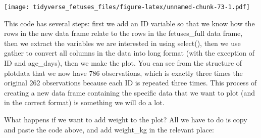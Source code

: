 \documentclass[
]{article}
\newenvironment{Shaded}{\begin{snugshade}}{\end{snugshade}}
\newcommand{\DataTypeTok}[1]{\textcolor[rgb]{0.13,0.29,0.53}{#1}}
\newcommand{\KeywordTok}[1]{\textcolor[rgb]{0.13,0.29,0.53}{\textbf{#1}}}
\newcommand{\NormalTok}[1]{#1}
\newcommand{\OperatorTok}[1]{\textcolor[rgb]{0.81,0.36,0.00}{\textbf{#1}}}
\newcommand{\StringTok}[1]{\textcolor[rgb]{0.31,0.60,0.02}{#1}}
\begin{document}
\texttt{[image: tidyverse\_fetuses\_files/figure-latex/unnamed-chunk-73-1.pdf]}

This code has several steps: first we add an ID variable so that we know
how the rows in the new data frame relate to the rows in the
fetuses\_full data frame, then we extract the variables we are
interested in using select(), then we use gather to convert all columns
in the data into long format (with the exception of ID and age\_days),
then we make the plot. You can see from the structure of plotdata that
we now have 786 observations, which is exactly three times the original
262 observations because each ID is repeated three times. This process
of creating a new data frame containing the specific data that we want
to plot (and in the correct format) is something we will do a lot.

What happens if we want to add weight to the plot? All we have to do is
copy and paste the code above, and add weight\_kg in the relevant place:

\begin{Shaded}
\end{Shaded}
\end{document}

